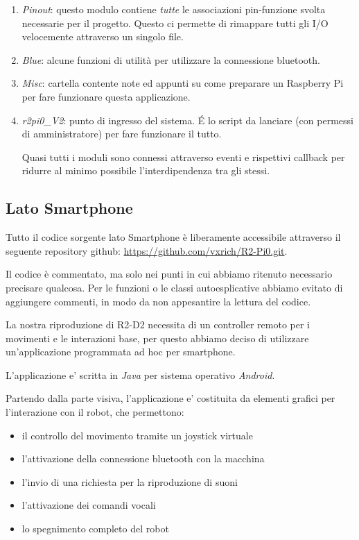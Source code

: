 \documentclass[12pt]{article}
\newcommand{\raspi}{Raspberry Pi}
\begin{document}
\begin{enumerate}
\item \emph{Pinout}: questo modulo contiene \emph{tutte} le associazioni pin-funzione svolta necessarie per il progetto. Questo ci permette di rimappare tutti gli I/O velocemente attraverso un singolo file.
\item \emph{Blue}: alcune funzioni di utilità per utilizzare la connessione bluetooth.
\item \emph{Misc}: cartella contente note ed appunti su come preparare un \raspi{} per fare funzionare questa applicazione.
\item \emph{r2pi0\_{}V2}: punto di ingresso del sistema. \'E lo script da lanciare (con permessi di amministratore) per fare funzionare il tutto.

Quasi tutti i moduli sono connessi attraverso eventi e rispettivi callback per ridurre al minimo possibile l'interdipendenza tra gli stessi.
\end{enumerate}

\subsection{Lato Smartphone}

Tutto il codice sorgente lato Smartphone è liberamente accessibile attraverso il seguente repository github: \url{https://github.com/vxrich/R2-Pi0.git}.

Il codice è commentato, ma solo nei punti in cui abbiamo ritenuto necessario precisare qualcosa. Per le funzioni o le classi autoesplicative abbiamo evitato di aggiungere commenti, in modo da non appesantire la lettura del codice.

La nostra riproduzione di R2-D2 necessita di un controller remoto per i movimenti e le interazioni base,
per questo abbiamo deciso di utilizzare un'applicazione programmata ad hoc per smartphone.

L'applicazione e' scritta in \emph{Java} per sistema operativo \emph{Android}.

\medskip

Partendo dalla parte visiva, l'applicazione e' costituita da elementi grafici per l'interazione con il robot, che permettono:
\begin{itemize}
\item il controllo del movimento tramite un joystick virtuale
\item l'attivazione della connessione bluetooth con la macchina
\item l'invio di una richiesta per la riproduzione di suoni
\item l'attivazione dei comandi vocali
\item lo spegnimento completo del robot
\end{itemize}
\end{document}
